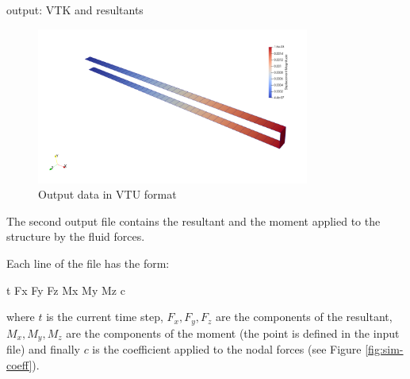 output: VTK and resultants
\begin{figure}[htbp!]
	\centering
	\includegraphics[width=0.8\textwidth]{images/vtk_disp.png}
	\caption{Output data in VTU format}
	\label{fig:vtk-out}
\end{figure}

The second output file contains the resultant and the moment applied to the structure by the fluid forces.

Each line of the file has the form:
\begin{verbatim*}
t Fx Fy Fz Mx My Mz c
\end{verbatim*}

where $t$ is the current time step, $F_x, F_y, F_z$ are the components of the resultant, $M_x, M_y, M_z$ are the components of the moment (the point is defined in the input file) and finally $c$ is the coefficient applied to the nodal forces (see Figure \ref{fig:sim-coeff}).